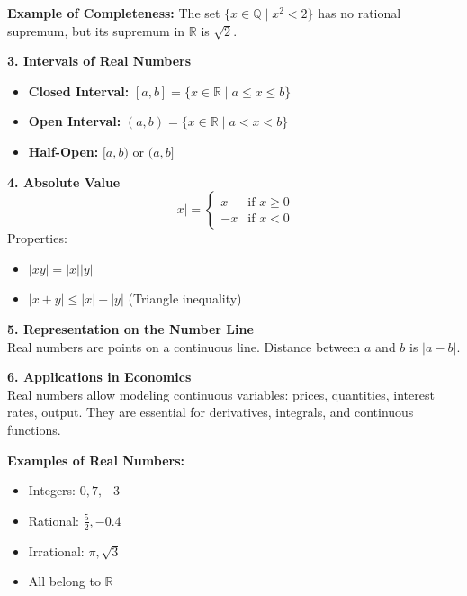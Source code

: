 \begin{tcolorbox}[examplebox]
\textbf{Example of Completeness:} The set $\{x \in \mathbb{Q} \mid x^2 < 2\}$ has no rational supremum, but its supremum in $\mathbb{R}$ is $\sqrt{2}$.
\end{tcolorbox}

\begin{tcolorbox}[sectionbox]
\textbf{3. Intervals of Real Numbers}
\begin{itemize}
    \item \textbf{Closed Interval:} $[a,b] = \{x \in \mathbb{R} \mid a \le x \le b\}$
    \item \textbf{Open Interval:} $(a,b) = \{x \in \mathbb{R} \mid a < x < b\}$
    \item \textbf{Half-Open:} $[a,b)$ or $(a,b]$
\end{itemize}
\end{tcolorbox}

\begin{tcolorbox}[sectionbox]
\textbf{4. Absolute Value}
\[
|x| = 
\begin{cases} 
x & \text{if } x \ge 0 \\ 
-x & \text{if } x < 0
\end{cases}
\]
Properties:
\begin{itemize}
    \item $|xy| = |x||y|$
    \item $|x+y| \le |x| + |y|$ (Triangle inequality)
\end{itemize}
\end{tcolorbox}

\begin{tcolorbox}[sectionbox]
\textbf{5. Representation on the Number Line}\\
Real numbers are points on a continuous line. Distance between $a$ and $b$ is $|a-b|$.
\end{tcolorbox}

\begin{tcolorbox}[sectionbox]
\textbf{6. Applications in Economics}\\
Real numbers allow modeling continuous variables: prices, quantities, interest rates, output. They are essential for derivatives, integrals, and continuous functions.
\end{tcolorbox}

\begin{tcolorbox}[examplebox]
\textbf{Examples of Real Numbers:}
\begin{itemize}
    \item Integers: $0,7,-3$
    \item Rational: $\frac{5}{2},-0.4$
    \item Irrational: $\pi, \sqrt{3}$
    \item All belong to $\mathbb{R}$
\end{itemize}
\end{tcolorbox}

